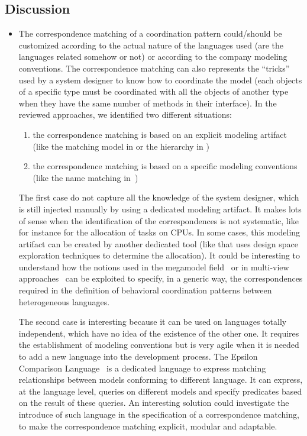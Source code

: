 		\subsection{Discussion}
	\begin{itemize}
			\item The correspondence matching of a coordination pattern could/should be customized according to the actual nature of the languages used (\eg are the languages related somehow or not) or according to the company modeling conventions. 
			The correspondence matching can also represents the ``tricks'' used by a system designer to know how to coordinate the model (\eg each objects of a specific type must be coordinated with all the objects of another type when they have the same number of methods in their interface). In the reviewed approaches, we identified two different situations:
			\begin{enumerate}
				\item the correspondence matching is based on an explicit modeling artifact (like the matching model in \cite{MarcoModels2014} or the hierarchy in \cite{modhelxbib,ptolemybib}) 	
				\item the correspondence matching is based on a specific modeling conventions (like the name matching in~\cite{mascotbib})
				\end{enumerate}
				
				The first case do not capture all the knowledge of the system designer, which is still injected manually by using a dedicated modeling artifact. It makes lots of sense when the identification of the correspondences is not systematic, like for instance for the allocation of tasks on CPUs. In some cases, this modeling artifact can be created by another dedicated tool (like \cite{kofman:hal-00950533} that uses design space exploration techniques to determine the allocation). It could be interesting to understand how the notions used in the megamodel field~\cite{megamodel} or in multi-view approaches~\cite{ieee42010} can be exploited to specify, in a generic way, the correspondences required in the definition of behavioral coordination patterns between heterogeneous languages. 
				
				The second case is interesting because it can be used on languages totally independent, \ie which have no idea of the existence of the other one. It requires the establishment of modeling conventions but is very agile when it is needed to add a new language into the development process. The Epsilon Comparison Language~\cite{epsilonbib} is a dedicated language to express matching relationships between models conforming to different language. It can express, at the language level, queries on different models and specify predicates based on the result of these queries. An interesting solution could investigate the introduce of such language in the specification of a correspondence matching,  to make the correspondence matching explicit, modular and adaptable.
				
				\end{itemize}